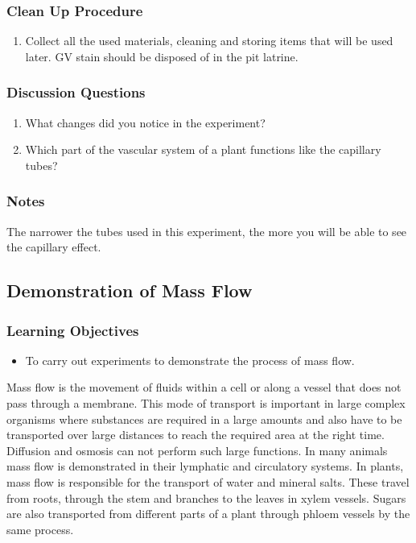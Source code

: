 \subsubsection*{Clean Up Procedure}
\begin{enumerate}
\item{Collect all the used materials, cleaning and storing items that will be used later. GV stain should be disposed of in the pit latrine.}
\end{enumerate}

\subsubsection*{Discussion Questions}
\begin{enumerate}
\item{What changes did you notice in the experiment?}
\item{Which part of the vascular system of a plant functions like the capillary tubes?}
\end{enumerate}

\subsubsection*{Notes}
The narrower the tubes used in this experiment, the more you will be able to see the capillary effect.

\subsection{Demonstration of Mass Flow}

\subsubsection*{Learning Objectives}
\begin{itemize}
\item{To carry out experiments to demonstrate the process of mass flow.}
\end{itemize}


Mass flow is the movement of fluids within a cell or along a vessel that does not pass through a membrane. This mode of transport is important in large complex organisms where substances are required in a large amounts and also have to be transported over large distances to reach the required area at the right time. Diffusion and osmosis can not perform such large functions. In many animals mass flow is demonstrated in their lymphatic and circulatory systems. In plants, mass flow is responsible for the transport of water and mineral salts. These travel from roots, through the stem and branches to the leaves in xylem vessels. Sugars are also transported from different parts of a plant through phloem vessels by the same process.

